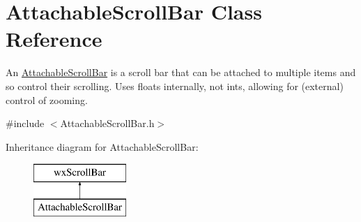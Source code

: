 \hypertarget{class_attachable_scroll_bar}{}\section{Attachable\+Scroll\+Bar Class Reference}
\label{class_attachable_scroll_bar}


An \hyperlink{class_attachable_scroll_bar}{Attachable\+Scroll\+Bar} is a scroll bar that can be attached to multiple items and so control their scrolling. Uses floats internally, not ints, allowing for (external) control of zooming.  




{\ttfamily \#include $<$Attachable\+Scroll\+Bar.\+h$>$}

Inheritance diagram for Attachable\+Scroll\+Bar\+:\begin{figure}[H]
\begin{center}
\leavevmode
\includegraphics[height=2.000000cm]{class_attachable_scroll_bar}
\end{center}
\end{figure}
